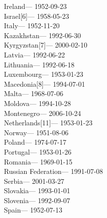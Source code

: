 \hspace*{0.333em}Ireland--- 1952-09-23\\
\hspace*{0.333em}Israel{[}6{]}--- 1958-05-23\\
\hspace*{0.333em}Italy--- 1952-11-20\\
\hspace*{0.333em}Kazakhstan--- 1992-06-30\\
\hspace*{0.333em}Kyrgyzstan{[}7{]}--- 2000-02-10\\
\hspace*{0.333em}Latvia--- 1992-06-22\\
\hspace*{0.333em}Lithuania--- 1992-06-18\\
\hspace*{0.333em}Luxembourg--- 1953-01-23\\
\hspace*{0.333em}Macedonia{[}8{]}--- 1994-07-01\\
\hspace*{0.333em}Malta--- 1968-07-06\\
\hspace*{0.333em}Moldova--- 1994-10-28\\
\hspace*{0.333em}Montenegro--- 2006-10-24\\
\hspace*{0.333em}Netherlands{[}11{]}--- 1953-01-23\\
\hspace*{0.333em}Norway--- 1951-08-06\\
\hspace*{0.333em}Poland--- 1974-07-17\\
\hspace*{0.333em}Portugal--- 1953-01-26\\
\hspace*{0.333em}Romania--- 1969-01-15\\
\hspace*{0.333em}Russian Federation--- 1991-07-08\\
\hspace*{0.333em}Serbia--- 2001-03-27\\
\hspace*{0.333em}Slovakia--- 1993-01-01\\
\hspace*{0.333em}Slovenia--- 1992-09-07\\
\hspace*{0.333em}Spain--- 1952-07-13\\
